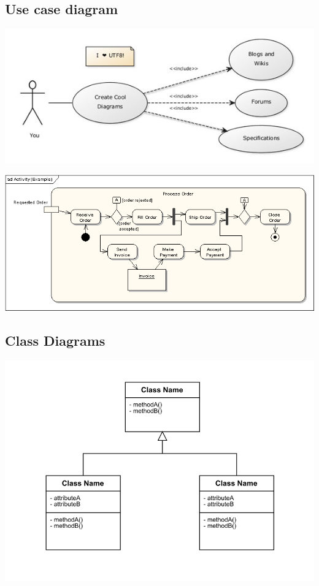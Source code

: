 \documentclass{article}[18pt]
\begin{document}
\subsection{Use case diagram}
	\begin{center}
		\includegraphics[scale=0.7]{UML1}
	\end{center}
	\begin{center}
		\includegraphics[scale=0.7]{UML2}
	\end{center}
\subsection{Class Diagrams}
\begin{center}
	\includegraphics[scale=0.7]{"Class Diagrams2"}
\end{center}
\end{document}

